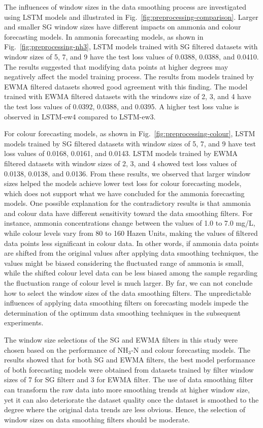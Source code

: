 The influences of window sizes in the data smoothing process are investigated using LSTM models and illustrated in Fig.~\ref{fig:preprocessing-comparison}. Larger and smaller SG window sizes have different impacts on ammonia and colour forecasting models. In ammonia forecasting models, as shown in Fig.~\ref{fig:preprocessing-nh3}, LSTM models trained with SG filtered datasets with window sizes of 5, 7, and 9 have the test loss values of 0.0388, 0.0388, and 0.0410. The results suggested that modifying data points at higher degrees may negatively affect the model training process. The results from models trained by EWMA filtered datasets showed good agreement with this finding. The model trained with EWMA filtered datasets with the windows size of 2, 3, and 4 have the test loss values of 0.0392, 0.0388, and 0.0395. A higher test loss value is observed in LSTM-ew4 compared to LSTM-ew3.

For colour forecasting models, as shown in Fig.~\ref{fig:preprocessing-colour}, LSTM models trained by SG filtered datasets with window sizes of 5, 7, and 9 have test loss values of 0.0168, 0.0161, and 0.0143. LSTM models trained by EWMA filtered datasets with window sizes of 2, 3, and 4 showed test loss values of 0.0138, 0.0138, and 0.0136. From these results, we observed that larger window sizes helped the models achieve lower test loss for colour forecasting models, which does not support what we have concluded for the ammonia forecasting models. One possible explanation for the contradictory results is that ammonia and colour data have different sensitivity toward the data smoothing filters. For instance, ammonia concentrations change between the values of 1.0 to 7.0 mg/L, while colour levels vary from 80 to 160 Hazen Units, making the values of filtered data points less significant in colour data. In other words, if ammonia data points are shifted from the original values after applying data smoothing techniques, the values might be biased considering the fluctuated range of ammonia is small, while the shifted colour level data can be less biased among the sample regarding the fluctuation range of colour level is much larger. By far, we can not conclude how to select the window sizes of the data smoothing filters. The unpredictable influences of applying data smoothing filters on forecasting models impede the determination of the optimum data smoothing techniques in the subsequent experiments. 

The window size selections of the SG and EWMA filters in this study were chosen based on the performance of NH$_{3}$-N and colour forecasting models. The results showed that for both SG and EWMA filters, the best model performance of both forecasting models were obtained from datasets trained by filter window sizes of 7 for SG filterr and 3 for EWMA filter. The use of data smoothing filter can transform the raw data into more smoothing trends at higher window size, yet it can also deteriorate the dataset quality once the dataset is smoothed to the degree where the original data trends are less obvious. Hence, the selection of window sizes on data smoothing filters should be moderate.

